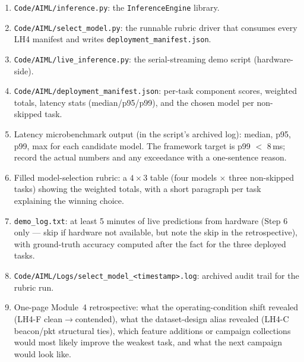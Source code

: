 \documentclass[11pt,letterpaper]{article}
\begin{document}
\begin{tcolorbox}[deliverable={Module~4 Final Deliverable (LH4-H)}]
	\begin{enumerate}[leftmargin=1.2em]
		\item \texttt{Code/AIML/inference.py}: the \texttt{InferenceEngine} library.
		\item \texttt{Code/AIML/select\_model.py}: the runnable rubric driver that consumes every LH4 manifest and writes \texttt{deployment\_manifest.json}.
		\item \texttt{Code/AIML/live\_inference.py}: the serial-streaming demo script (hardware-side).
		\item \texttt{Code/AIML/deployment\_manifest.json}: per-task component scores, weighted totals, latency stats (median/p95/p99), and the chosen model per non-skipped task.
		\item Latency microbenchmark output (in the script's archived log): median, p95, p99, max for each candidate model. The framework target is p99 $<$ 8\,ms; record the actual numbers and any exceedance with a one-sentence reason.
		\item Filled model-selection rubric: a $4 \times 3$ table (four models $\times$ three non-skipped tasks) showing the weighted totals, with a short paragraph per task explaining the winning choice.
		\item \texttt{demo\_log.txt}: at least 5 minutes of live predictions from hardware (Step 6 only --- skip if hardware not available, but note the skip in the retrospective), with ground-truth accuracy computed after the fact for the three deployed tasks.
		\item \texttt{Code/AIML/Logs/select\_model\_<timestamp>.log}: archived audit trail for the rubric run.
		\item One-page Module~4 retrospective: what the operating-condition shift revealed (LH4-F clean$\to$contended), what the dataset-design alias revealed (LH4-C beacon/pkt structural ties), which feature additions or campaign collections would most likely improve the weakest task, and what the next campaign would look like.
	\end{enumerate}
\end{tcolorbox}
\end{document}
